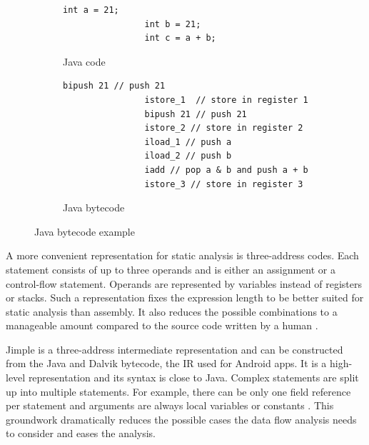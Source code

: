 \documentclass[../draft.tex]{subfiles}
\begin{document}
    \begin{figure}[ht]
        \centering
        \begin{subfigure}[b]{0.45\textwidth}
            \centering
            \begin{lstlisting}[gobble=16]
                int a = 21;
                int b = 21;
                int c = a + b;
            \end{lstlisting}
            \caption{Java code}
            \label{lst:jvmstack_a}
        \end{subfigure}
        \hfill
        \begin{subfigure}[b]{0.45\textwidth}
            \centering
            \begin{lstlisting}[gobble=16]
                bipush 21 // push 21
                istore_1  // store in register 1
                bipush 21 // push 21
                istore_2 // store in register 2
                iload_1 // push a
                iload_2 // push b
                iadd // pop a & b and push a + b
                istore_3 // store in register 3
            \end{lstlisting}
            \caption{Java bytecode}
            \label{lst:jvmstack_b}
        \end{subfigure}
        \caption{Java bytecode example}
        \label{lst:jvmstack}
    \end{figure}

    A more convenient representation for static analysis is three-address codes.
    Each statement consists of up to three operands and is either an assignment or a control-flow statement.
    Operands are represented by variables instead of registers or stacks.
    Such a representation fixes the expression length to be better suited for static analysis than assembly. It also reduces the possible combinations to a manageable amount compared to the source code written by a human \cite{Aho1986}.

    Jimple is a three-address intermediate representation and can be constructed from the Java and Dalvik bytecode, the IR used for Android apps.
    It is a high-level representation and its syntax is close to Java.
    Complex statements are split up into multiple statements.
    For example, there can be only one field reference per statement and arguments are always local variables or constants \cite{Valleerai2004}.
    This groundwork dramatically reduces the possible cases the data flow analysis needs to consider and eases the analysis.
\end{document}
